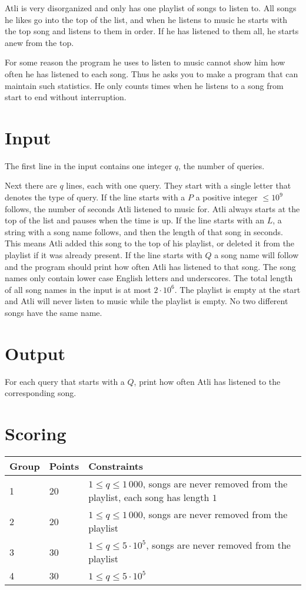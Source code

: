 
Atli is very disorganized and only has one playlist of songs to listen to. All
songs he likes go into the top of the list, and when he listens to music he starts
with the top song and listens to them in order. If he has listened to them all, he starts
anew from the top.

For some reason the program he uses to listen to music cannot show him how often
he has listened to each song. Thus he asks you to make a program that can maintain
such statistics. He only counts times when he listens to a song from start to end
without interruption.

\section*{Input}
The first line in the input contains one integer $q$, the number of queries.

Next there are $q$ lines, each with one query. They start with a single letter
that denotes the type of query. If the line starts with a $P$ a positive integer $\leq 10^9$
follows, the number of seconds Atli listened to music for. Atli always starts at the top of the list 
and pauses when the time is up. If the line starts with an $L$, a
string with a song name follows, and then the length of that song in seconds. This means Atli
added this song to the top of his playlist, or deleted it from the playlist if it was already present.
If the line starts with $Q$ a song name will follow and the program should print how often Atli has
listened to that song. The song names only contain lower
case English letters and underscores. The total length of all song names in the input is at most
$2 \cdot 10^6$. The playlist is empty at the start and Atli will never listen to music while the playlist
is empty. No two different songs have the same name.

\section*{Output}
For each query that starts with a $Q$, print how often Atli has listened to the corresponding song.

\section*{Scoring}
\begin{tabular}{|l|l|l|}
\hline
Group & Points & Constraints \\ \hline
1     & 20   & $1 \leq q \leq 1\,000$, songs are never removed from the playlist, each song has length $1$ \\ \hline
2     & 20   & $1 \leq q \leq 1\,000$, songs are never removed from the playlist \\ \hline
3     & 30   & $1 \leq q \leq 5 \cdot 10^5$, songs are never removed from the playlist \\ \hline
4     & 30   & $1 \leq q \leq 5 \cdot 10^5$ \\ \hline
\end{tabular}

